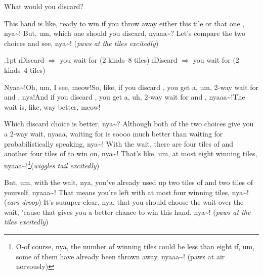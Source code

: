 \begin{screen}
\bp
{}
\ep
\vspace{-10pt}What would you discard? \vspace{-5pt}
\end{screen}

\bigskip
\noindent

This hand is like, ready to win if you throw away either this tile {} or that one {}, nya\textasciitilde!
But, um, which one should you discard, nyaaa\textasciitilde? Let’s compare the two choices and
see, nya\textasciitilde! (\textit{paws at the tiles excitedly})

\bi\itemsep.1pt
\i Discard {} $\Rightarrow$ you wait for { \mahjong[15pt]{8p]}} (2 kinds--8 tiles)
\i Discard {} $\Rightarrow$ you wait for { \mahjong[15pt]{6p]}} (2 kinds--4 tiles)
\ei

Nyaa\textasciitilde!\@ Oh, um, I see, meow!\@  So, like, if you discard {}, you get a, um, 2-way wait for {} and {}, nya!\@ And if you discard {}, you get a, uh, 2-way wait for {} and {}, nyaaa\textasciitilde!\@ The { } wait is, like, way better, meow!\@

\bigskip


Which discard choice is better, nya\textasciitilde? Although both of the two choices give
you a 2-way wait, nyaaa, waiting for {} is soooo
much better than waiting for {}
probabilistically speaking, nya\textasciitilde! With the {} wait, there
are four tiles of {} and another four tiles
of {} to win on, nya\textasciitilde! That’s like, um, at most
eight winning tiles, nyaaa\textasciitilde!\footnote{
    O-of course, nya,
    the number of winning tiles could be less than eight if, um, some of them have
    already been thrown away, nyaaa\textasciitilde! (paws at air nervously)

}(\textit{wiggles tail excitedly})

But, um, with the {} wait, nya,
you’ve already used up two tiles of {} and two tiles of {}
yourself, nyaaa\textasciitilde! That means you’re left with at most four winning tiles, nya\textasciitilde!
(\textit{ears droop}) It’s suuuper clear, nya, that you should choose the {} wait over the {} wait, 'cause
that gives you a better chance to win this hand, nya\textasciitilde! (\textit{paws at the tiles
excitedly})

